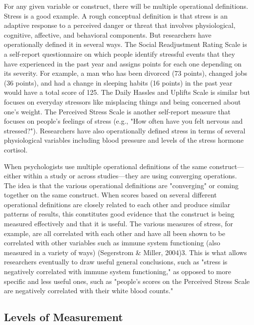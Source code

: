 For any given variable or construct, there will be multiple operational definitions. Stress is a good example. A rough conceptual definition is that stress is an adaptive response to a perceived danger or threat that involves physiological, cognitive, affective, and behavioral components. But researchers have operationally defined it in several ways. The Social Readjustment Rating Scale is a self-report questionnaire on which people identify stressful events that they have experienced in the past year and assigns points for each one depending on its severity. For example, a man who has been divorced (73 points), changed jobs (36 points), and had a change in sleeping habits (16 points) in the past year would have a total score of 125. The Daily Hassles and Uplifts Scale is similar but focuses on everyday stressors like misplacing things and being concerned about one's weight. The Perceived Stress Scale is another self-report measure that focuses on people's feelings of stress (e.g., "How often have you felt nervous and stressed?"). Researchers have also operationally defined stress in terms of several physiological variables including blood pressure and levels of the stress hormone cortisol.

When psychologists use multiple operational definitions of the same construct—either within a study or across studies—they are using converging operations. The idea is that the various operational definitions are "converging" or coming together on the same construct. When scores based on several different operational definitions are closely related to each other and produce similar patterns of results, this constitutes good evidence that the construct is being measured effectively and that it is useful. The various measures of stress, for example, are all correlated with each other and have all been shown to be correlated with other variables such as immune system functioning (also measured in a variety of ways) (Segerstrom \& Miller, 2004)3. This is what allows researchers eventually to draw useful general conclusions, such as "stress is negatively correlated with immune system functioning," as opposed to more specific and less useful ones, such as "people's scores on the Perceived Stress Scale are negatively correlated with their white blood counts."

\subsection{Levels of Measurement}

